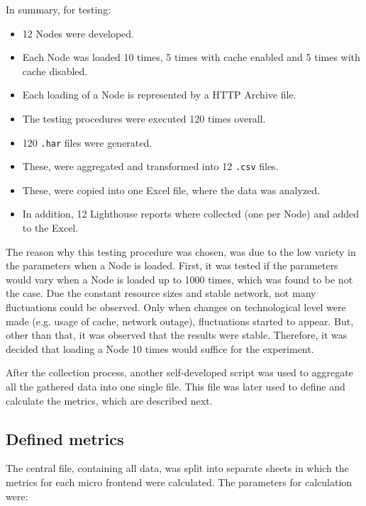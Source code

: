 In summary, for testing:

\begin{itemize}[noitemsep]
	\item 12 Nodes were developed.
	\item Each Node was loaded 10 times, 5 times with cache enabled and 5 times with cache disabled.
	\item Each loading of a Node is represented by a HTTP Archive file.
	\item The testing procedures were executed 120 times overall.
	\item 120 \texttt{.har} files were generated.
	\item These, were aggregated and transformed into 12 \texttt{.csv} files.
	\item These, were copied into one Excel file, where the data was analyzed.
	\item In addition, 12 Lighthouse reports where collected (one per Node) and added to the Excel.
\end{itemize}

The reason why this testing procedure was chosen, was due to the low variety in the parameters when a Node is loaded. 
First, it was tested if the parameters would vary when a Node is loaded up to 1000 times, which was found to be not the case. 
Due the constant resource sizes and stable network, not many fluctuations could be observed. 
Only when changes on technological level were made (e.g. usage of cache, network outage), fluctuations started to appear. 
But, other than that, it was observed that the results were stable. Therefore, it was decided that loading a Node 10 times would suffice for the experiment.

After the collection process, another self-developed script was used to aggregate all the gathered data into one single file. This file was later used to define and calculate the metrics, which are described next.

\subsection{Defined metrics}
\label{metric_definition}
The central file, containing all data, was split into separate sheets in which the metrics for each micro frontend were calculated. The parameters for calculation were:

